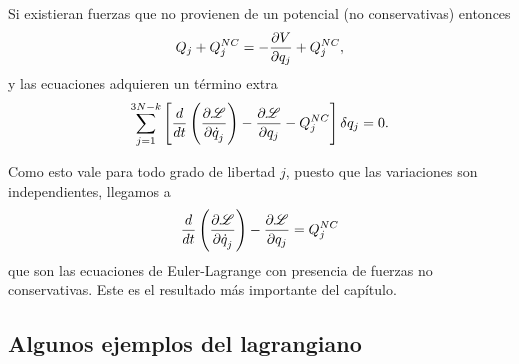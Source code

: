 \documentclass[10pt,oneside]{CBFT_book}
\begin{document}
Si existieran fuerzas que no provienen de un potencial (no conservativas) entonces
\[
	Q_j + Q_j^{NC} = -\frac{\partial^{\hspace{-0.05em}} {V}}{\partial {q_j}^{\hspace{-0.05em}}} + Q_j^{NC},
\]
y las ecuaciones adquieren un término extra 
\[
	\sum_{j=1}^{3N-k} \left[
	\frac{d}{dt} \left( \frac{\partial^{\hspace{-0.05em}} {\mathscr{L}}}{\partial {\dot{q}_j}^{\hspace{-0.05em}}} \right) - \frac{\partial^{\hspace{-0.05em}} {\mathscr{L}}}{\partial {q_j}^{\hspace{-0.05em}}} - Q_j^{NC} \right] \delta q_j = 0.
\]

Como esto vale para todo grado de libertad $j$, puesto que las variaciones son independientes, llegamos a
\[
	\frac{d}{dt} \left( \frac{\partial^{\hspace{-0.05em}} {\mathscr{L}}}{\partial {\dot{q}_j}^{\hspace{-0.05em}}} \right) -  \frac{\partial^{\hspace{-0.05em}} {\mathscr{L}}}{\partial {q_j}^{\hspace{-0.05em}}} = Q_j^{NC}
\]
que son las ecuaciones de Euler-Lagrange con presencia de fuerzas no conservativas. 
Este es el resultado más importante del capítulo.

\subsection{Algunos ejemplos del lagrangiano}
\end{document}

